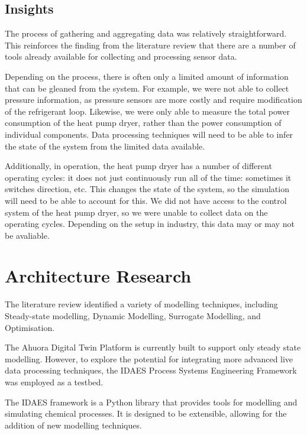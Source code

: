 \documentclass[12pt]{report}
\begin{document}
\section{Insights}

The process of gathering and aggregating data was relatively straightforward. This reinforces the finding from the literature review that there are a number of tools already available for collecting and processing sensor data. 

Depending on the process, there is often only a limited amount of information that can be gleaned from the system. For example, we were not able to collect pressure information, as pressure sensors are more costly and require modification of the refrigerant loop. Likewise, we were only able to measure the total power consumption of the heat pump dryer, rather than the power consumption of individual components. Data processing techniques will need to be able to infer the state of the system from the limited data available.

Additionally, in operation, the heat pump dryer has a number of different operating cycles: it does not just continuously run all of the time: sometimes it switches direction, etc. This changes the state of the system, so the simulation will need to be able to account for this. We did not have access to the control system of the heat pump dryer, so we were unable to collect data on the operating cycles. Depending on the setup in industry, this data may or may not be avaliable.




\chapter{Architecture Research}

The literature review identified a variety of modelling techniques, including Steady-state modelling, Dynamic Modelling, Surrogate Modelling, and Optimisation. 

The Ahuora Digital Twin Platform is currently built to support only steady state modelling. However, to explore the potential for integrating more advanced live data processing techniques, the IDAES Process Systems Engineering Framework was employed as a testbed.

The IDAES framework is a Python library that provides tools for modelling and simulating chemical processes. It is designed to be extensible, allowing for the addition of new modelling techniques.
\end{document}
